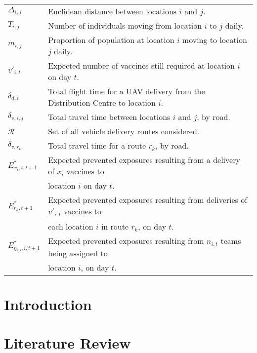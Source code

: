 \documentclass[11pt]{book}
\begin{document}
\begin{longtable}[c]{ll}
$\Delta_{i,j}$ & Euclidean distance between locations $i$ and $j$. \\
$T_{i,j}$ & Number of individuals moving from location $i$ to $j$ daily. \\
$m_{i,j}$ & Proportion of population at location $i$ moving to location $j$ daily. \\
$v'_{i,t}$ & Expected number of vaccines still required at location $i$ on day $t$. \\
$\delta_{d,i}$ & Total flight time for a UAV delivery from the Distribution Centre to location $i$. \\
$\delta_{v,i,j}$ & Total travel time between locations $i$ and $j$, by road. \\
$\mathcal{R}$ & Set of all vehicle delivery routes considered. \\
$\delta_{v,r_{k}}$ & Total travel time for a route $r_{k}$, by road. \\
$E^{*}_{x_{i},i,t+1}$ & Expected prevented exposures resulting from a delivery of $x_{i}$ vaccines to \\ &location $i$ on day $t$. \\
$E^{*}_{r_{k},t+1}$ & Expected prevented exposures resulting from deliveries of $v'_{i,t}$ vaccines to \\ &each location $i$ in route $r_{k}$, on day $t$. \\
$E^{*}_{\eta_{i,t},i,t+1}$ & Expected prevented exposures resulting from $n_{i,t}$ teams being assigned to \\ &location $i$, on day $t$.
\label{tab:symbols_list}\\
\end{longtable}


%

\chapter{Introduction}


%

\chapter{Literature Review}

\end{document}
